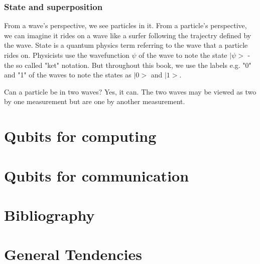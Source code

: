\documentclass{book}
\begin{document}
\subsection{State and superposition}
From a wave's perspective, we see particles in it. From a particle's perspective, we can imagine it rides on a wave like a surfer following the trajectry defined by the wave. State is a quantum physics term referring to the wave that a particle rides on. Physicists use the wavefunction $\psi$ of the wave to note the state $|\psi>$ - the so called "ket" notation. But throughout this book, we use the labels e.g. "0" and "1" of the waves to note the states as $|0>$ and $|1>$. 

Can a particle be in two waves? Yes, it can. The two waves may be viewed as two by one measurement but are one by another measurement. 

\chapter{Qubits for computing}
\chapter{Qubits for communication}
\chapter{Bibliography}
\chapter{General Tendencies}

\backmatter
{}
\printindex
\end{document}
